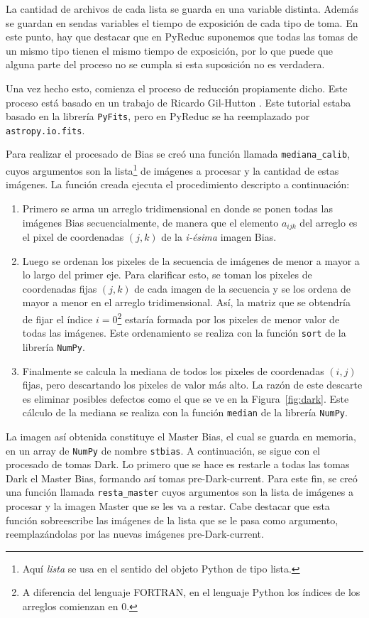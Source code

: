 \documentclass[a4paper, 12pt]{article}
\begin{document}
La cantidad de archivos de cada lista se guarda en una variable distinta. Además se guardan en sendas variables el tiempo de exposición de cada tipo de toma. En este punto, hay que destacar que en PyReduc suponemos que todas las tomas de un mismo tipo tienen el mismo tiempo de exposición, por lo que puede que alguna parte del proceso no se cumpla si esta suposición no es verdadera.

Una vez hecho esto, comienza el proceso de reducción propiamente dicho. Este proceso está basado en un trabajo de Ricardo Gil-Hutton \cite{gil-hutton}. Este tutorial estaba basado en la librería \texttt{PyFits},
pero en PyReduc se ha  reemplazado por {\tt astropy.io.fits}.


 Para realizar el procesado de Bias se creó una función llamada \texttt{mediana\_calib}, cuyos argumentos son la lista\footnote{Aquí {\it lista} se usa en el sentido del objeto Python de tipo lista.} de imágenes a procesar y la cantidad de estas imágenes. La función creada ejecuta el procedimiento descripto a continuación:
 \begin{enumerate}
 \item Primero se arma un arreglo tridimensional en donde se ponen todas las imágenes Bias secuencialmente, de manera que el elemento $a_{ijk}$ del arreglo es el pixel de coordenadas $(j,k)$ de la {\it i-ésima} imagen Bias.
 \item Luego se ordenan los pixeles de la secuencia de imágenes de menor a mayor a lo largo del primer eje. Para clarificar esto, se toman los pixeles de coordenadas fijas $(j,k)$ de cada imagen de la secuencia y se los ordena de mayor a menor en el arreglo tridimensional. Así, la matriz que se obtendría de fijar el índice $i=0$\footnote{A diferencia del lenguaje FORTRAN, en el lenguaje Python los índices de los arreglos comienzan en 0.} estaría formada por los pixeles de menor valor de todas las imágenes. Este ordenamiento se realiza con la función \texttt{sort} de la librería \texttt{NumPy}.
 \item Finalmente se calcula la mediana de todos los pixeles de coordenadas $(i,j)$ fijas, pero descartando los pixeles de valor más alto. La razón de este descarte es eliminar posibles defectos como el que se ve en la Figura~\ref{fig:dark}. Este cálculo de la mediana se realiza con la función \texttt{median} de la librería \texttt{NumPy}.
 \end{enumerate}

 

 La imagen así obtenida constituye el Master Bias, el cual se guarda en memoria, en un array de \texttt{NumPy} de nombre \texttt{stbias}. A continuación, se sigue con el procesado de tomas Dark. Lo primero que se hace es restarle a todas las tomas Dark el Master Bias, formando así tomas pre-Dark-current. Para este fin, se creó una función llamada \texttt{resta\_master} cuyos argumentos son la lista de imágenes a procesar y la imagen Master que se les va a restar. Cabe destacar que esta función sobreescribe las imágenes de la lista que se le pasa como argumento, reemplazándolas por las nuevas imágenes pre-Dark-current.
\end{document}
